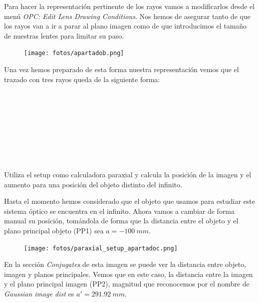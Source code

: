 \documentclass[11pt]{article}
\newcommand{\preguntaAlaMadreDeRocio}[1]{\begin{Theorem}{#1}{}\end{Theorem}}
\begin{document}
        \noindent Para hacer la representación pertinente de los rayos vamos a modificarlos desde el menú \textit{OPC: Edit Lens Drawing Conditions}. Nos hemos de asegurar tanto de que los rayos van a ir a parar al plano imagen como de que introducimos el tamaño de nuestras lentes para limitar su paso. \\
        
        \begin{figure}
            \vspace{-0.5cm}
            \centering
            \texttt{[image: fotos/apartadob.png]}
        \end{figure}

        \noindent Una vez hemos preparado de esta forma nuestra representación vemos que el trazado con tres rayos queda de la siguiente forma:\\\hspace{0cm}\\\hspace{0cm}\\\hspace{0cm}\\\hspace{0cm}\\\hspace{0cm}\\\hspace{0cm}\\\hspace{0cm}\\\hspace{0cm}\\

        \preguntaAlaMadreDeRocio{Utiliza el setup como calculadora paraxial y calcula la posición de la imagen y el aumento para una posición del objeto distinto del infinito.}
        \noindent Hasta el momento hemos considerado que el objeto que usamos para estudiar este sistema óptico se encuentra en el infinito. Ahora vamos a cambiar de forma manual su posición, tomándola de forma que la distancia entre el objeto y el plano principal objeto (PP1) sea $a = -100\ mm$.\\
        
        \begin{figure}
            \vspace{-0.6cm}
            \centering
            \texttt{[image: fotos/paraxial\_setup\_apartadoc.png]}
        \end{figure}
        \noindent En la sección \textit{Conjugates} de esta imagen se puede ver la distancia entre objeto, imagen y planos principales. Vemos que en este caso, la distancia entre la imagen y el plano principal imagen (PP2), magnitud que reconocemos por el nombre de \textit{Gaussian image dist} es $a' = 291.92\ mm$.\\
        
\end{document}
